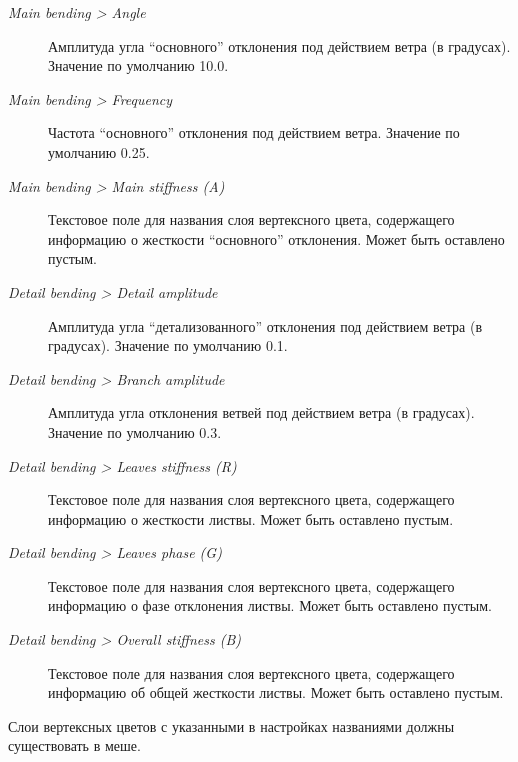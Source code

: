 \documentclass[a4paper,12pt,oneside]{sphinxmanual}
\begin{document}
\begin{DUlineblock}{0em}
\item[] 
\end{DUlineblock}
\begin{description}
\item[{\emph{Main bending \textgreater{} Angle}}] \leavevmode
Амплитуда угла ``основного'' отклонения под действием ветра (в градусах). Значение по умолчанию 10.0.

\item[{\emph{Main bending \textgreater{} Frequency}}] \leavevmode
Частота ``основного'' отклонения под действием ветра. Значение по умолчанию 0.25.

\item[{\emph{Main bending \textgreater{} Main stiffness (A)}}] \leavevmode
Текстовое поле для названия слоя вертексного цвета, содержащего информацию о жесткости ``основного'' отклонения. Может быть оставлено пустым.

\item[{\emph{Detail bending \textgreater{} Detail amplitude}}] \leavevmode
Амплитуда угла ``детализованного'' отклонения под действием ветра (в градусах). Значение по умолчанию 0.1.

\item[{\emph{Detail bending \textgreater{} Branch amplitude}}] \leavevmode
Амплитуда угла отклонения ветвей под действием ветра (в градусах). Значение по умолчанию 0.3.

\item[{\emph{Detail bending \textgreater{} Leaves stiffness (R)}}] \leavevmode
Текстовое поле для названия слоя вертексного цвета, содержащего информацию о жесткости листвы. Может быть оставлено пустым.

\item[{\emph{Detail bending \textgreater{} Leaves phase (G)}}] \leavevmode
Текстовое поле для названия слоя вертексного цвета, содержащего информацию о фазе отклонения листвы. Может быть оставлено пустым.

\item[{\emph{Detail bending \textgreater{} Overall stiffness (B)}}] \leavevmode
Текстовое поле для названия слоя вертексного цвета, содержащего информацию об общей жесткости листвы. Может быть оставлено пустым.

\end{description}

Слои вертексных цветов с указанными в настройках названиями должны существовать в меше.
\end{document}
